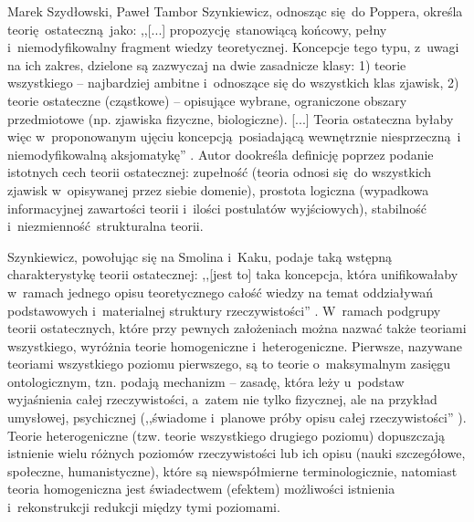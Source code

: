 \begin{artplenv2auth}{Marek Szydłowski, Paweł Tambor}
Szynkiewicz, odnosząc się~do Poppera, określa teorię~ostateczną~jako: ,,[...] propozycję~stanowiącą końcowy, pełny i~niemodyfikowalny fragment wiedzy teoretycznej. Koncepcje tego typu, z~uwagi na ich zakres, dzielone są zazwyczaj na dwie zasadnicze klasy: 1) teorie wszystkiego -- najbardziej ambitne i~odnoszące się do wszystkich klas zjawisk, 2) teorie ostateczne (cząstkowe) -- opisujące wybrane, ograniczone obszary przedmiotowe (np. zjawiska fizyczne, biologiczne). [...] Teoria ostateczna byłaby więc w~proponowanym ujęciu koncepcją~posiadającą wewnętrznie niesprzeczną~i niemodyfikowalną aksjomatykę''
\parencite[][s.~1274–1275]{szynkiewicz_teorie_2011}. %
 Autor dookreśla definicję poprzez podanie istotnych cech teorii ostatecznej: zupełność (teoria odnosi się~do wszystkich zjawisk w~opisywanej przez siebie domenie), prostota logiczna (wypadkowa informacyjnej zawartości teorii i~ilości postulatów wyjściowych), stabilność i~niezmienność~strukturalna teorii.

Szynkiewicz, powołując się na Smolina i~Kaku, podaje taką wstępną charakterystykę teorii ostatecznej: ,,[jest to] taka koncepcja, która unifikowałaby w~ramach jednego opisu teoretycznego całość wiedzy na temat oddziaływań podstawowych i~materialnej struktury rzeczywistości''
\parencite[][s.~16]{szynkiewicz_teorie_2009}. %
 W~ramach podgrupy teorii ostatecznych, które przy pewnych założeniach można nazwać także teoriami wszystkiego, wyróżnia teorie homogeniczne i~heterogeniczne. Pierwsze, nazywane teoriami wszystkiego poziomu pierwszego, są to teorie o~maksymalnym zasięgu ontologicznym, tzn. podają mechanizm -- zasadę, która leży u~podstaw wyjaśnienia całej rzeczywistości, a~zatem nie tylko fizycznej, ale na przykład umysłowej, psychicznej (,,świadome i~planowe próby opisu całej rzeczywistości'' 
\parencite[][s.~30]{szynkiewicz_teorie_2009}%
). Teorie heterogeniczne (tzw. teorie wszystkiego drugiego poziomu) dopuszczają istnienie wielu różnych poziomów rzeczywistości lub ich opisu (nauki szczegółowe, społeczne, humanistyczne), które są niewspółmierne terminologicznie, natomiast teoria homogeniczna jest świadectwem (efektem) możliwości istnienia i~rekonstrukcji redukcji między tymi poziomami.


\end{artplenv2auth}

